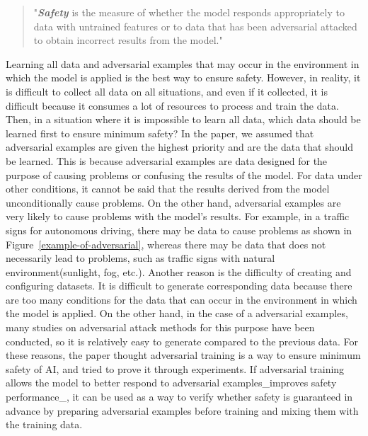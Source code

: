 \documentclass[journal,article,submit,moreauthors,pdftex]{Definitions/mdpi}
\begin{document}
\begin{quote}
    "\textit{\textbf{Safety}} is the measure of whether the model responds appropriately to data with untrained features or to data that has been adversarial attacked to obtain incorrect results from the model."
\end{quote}

Learning all data and adversarial examples that may occur in the environment in which the model is applied is the best way to ensure safety.
However, in reality, it is difficult to collect all data on all situations, and even if it collected, it is difficult because it consumes a lot of resources to process and train the data.
Then, in a situation where it is impossible to learn all data, which data should be learned first to ensure minimum safety?
In the paper, we assumed that adversarial examples are given the highest priority and are the data that should be learned.
This is because adversarial examples are data designed for the purpose of causing problems or confusing the results of the model.
For data under other conditions, it cannot be said that the results derived from the model unconditionally cause problems.
On the other hand, adversarial examples are very likely to cause problems with the model's results.
For example, in a traffic signs for autonomous driving, there may be data to cause problems as shown in Figure~\ref{example-of-adversarial}, whereas there may be data that does not necessarily lead to problems, such as traffic signs with natural environment(sunlight, fog, etc.).
Another reason is the difficulty of creating and configuring datasets. It is difficult to generate corresponding data because there are too many conditions for the data that can occur in the environment in which the model is applied.
On the other hand, in the case of a adversarial examples, many studies on adversarial attack methods for this purpose have been conducted, so it is relatively easy to generate compared to the previous data.
For these reasons, the paper thought adversarial training is a way to ensure minimum safety of AI, and tried to prove it through experiments.
If adversarial training allows the model to better respond to adversarial examples\_improves safety performance\_, it can be used as a way to verify whether safety is guaranteed in advance by preparing adversarial examples before training and mixing them with the training data. \\
\end{document}
